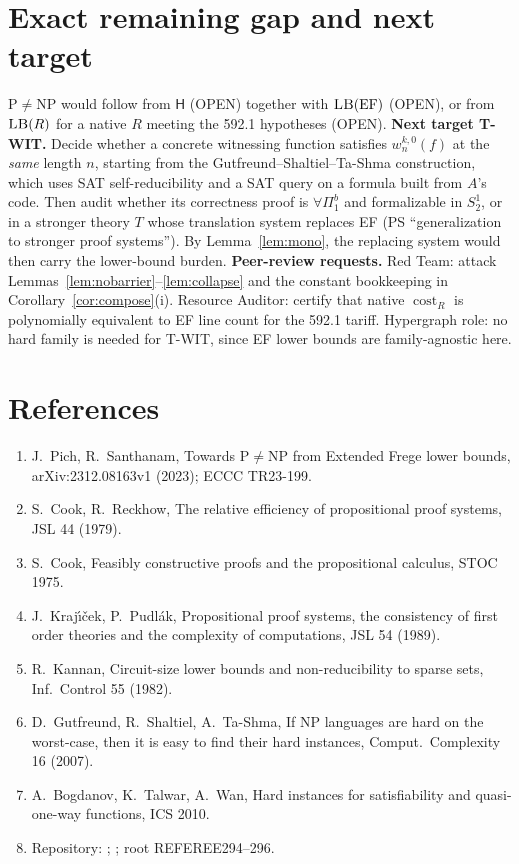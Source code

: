 \documentclass[11pt]{article}
\theoremstyle{definition}
\newcommand{\EF}{\mathrm{EF}}
\begin{document}
\section{Exact remaining gap and next target}
P$\ne$NP would follow from $\mathsf H$ (OPEN) together with $\textsc{LB}(\EF)$ (OPEN), or from
$\textsc{LB}(R)$ for a native $R$ meeting the 592.1 hypotheses (OPEN).
\textbf{Next target T-WIT.} Decide whether a concrete witnessing function satisfies
$w^{k,0}_n(f)$ at the \emph{same} length $n$, starting from the
Gutfreund--Shaltiel--Ta-Shma construction, which uses SAT self-reducibility and a SAT query on
a formula built from $A$'s code. Then audit whether its correctness proof is $\forall\Pi^b_1$ and
formalizable in $S^1_2$, or in a stronger theory $T$ whose translation system replaces EF
(PS ``generalization to stronger proof systems''). By Lemma~\ref{lem:mono}, the replacing
system would then carry the lower-bound burden.
\textbf{Peer-review requests.} Red Team: attack Lemmas~\ref{lem:nobarrier}--\ref{lem:collapse}
and the constant bookkeeping in Corollary~\ref{cor:compose}(i).
Resource Auditor: certify that native $\operatorname{cost}_R$ is polynomially equivalent to
EF line count for the 592.1 tariff.
Hypergraph role: no hard family is needed for T-WIT, since EF lower bounds are family-agnostic
here.

\section*{References}
\begin{enumerate}
\item J.~Pich, R.~Santhanam, Towards P$\ne$NP from Extended Frege lower bounds, arXiv:2312.08163v1 (2023); ECCC TR23-199.
\item S.~Cook, R.~Reckhow, The relative efficiency of propositional proof systems, JSL 44 (1979).
\item S.~Cook, Feasibly constructive proofs and the propositional calculus, STOC 1975.
\item J.~Kraj\'{\i}\v{c}ek, P.~Pudl\'ak, Propositional proof systems, the consistency of first order theories and the complexity of computations, JSL 54 (1989).
\item R.~Kannan, Circuit-size lower bounds and non-reducibility to sparse sets, Inf.\ Control 55 (1982).
\item D.~Gutfreund, R.~Shaltiel, A.~Ta-Shma, If NP languages are hard on the worst-case, then it is easy to find their hard instances, Comput.\ Complexity 16 (2007).
\item A.~Bogdanov, K.~Talwar, A.~Wan, Hard instances for satisfiability and quasi-one-way functions, ICS 2010.
\item Repository: ; ; root  REFEREE294--296.
\end{enumerate}
\end{document}
